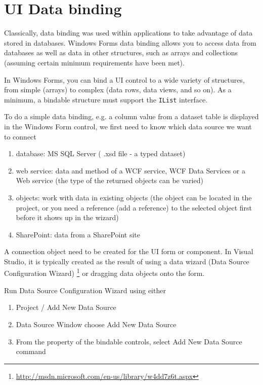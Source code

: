 \section{UI Data binding}
\label{sec:UI-data-binding-WinForms}

Classically, data binding was used within applications to take advantage of data
stored in databases. Windows Forms data binding allows you to access data from
databases as well as data in other structures, such as arrays and collections
(assuming certain minimum requirements have been met). 

In Windows Forms, you can bind a UI control to a wide variety of structures,
from simple (arrays) to complex (data rows, data views, and so on). As a
minimum, a bindable structure must support the \verb!IList! interface.


 To do a simple data binding, e.g. a column value from a dataset table is
displayed in the Windows Form control, we first need to know which data
source we want to connect
\begin{enumerate}
  \item database: MS SQL Server ( .xsd file - a typed dataset)
  
  \item web service: data and method of a WCF service, WCF Data Services or a
  Web service (the type of the returned objects can be varied)
  
  \item objects: work with data in existing objects (the object can be located
  in the project, or you need a reference (add a reference) to the selected
  object first before it shows up in the wizard)
  
  \item SharePoint: data from a SharePoint site
  
\end{enumerate}

A connection object need to be created for the UI form or
component. In Visual Studio, it is typically created as the result of using a
data wizard (Data Source Configuration Wizard)
\footnote{\url{http://msdn.microsoft.com/en-us/library/w4dd7z6t.aspx}} or
dragging data objects onto the form.

Run Data Source Configuration Wizard using either
\begin{enumerate}
  \item Project / Add New Data Source
  \item Data Source Window choose Add New Data Source
  \item From the property of the bindable controls, select Add New Data Source
  command
\end{enumerate}



